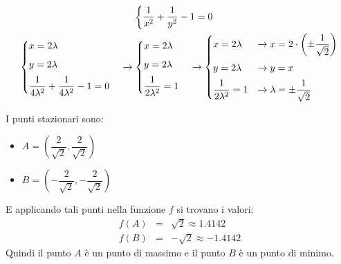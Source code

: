\documentclass[a4paper]{article}
\begin{document}
\begin{gather*}
\begin{cases}
			\dfrac{1}{x^{2}} + \dfrac{1}{y^{2}} - 1 = 0 \\
		\end{cases}
		\\
		\begin{cases}
			x = 2\lambda \vspace{.5em} \\
			y = 2\lambda \vspace{.5em} \\
			\dfrac{1}{4\lambda^{2}} + \dfrac{1}{4\lambda^{2}} - 1 = 0 \\
		\end{cases}
		\rightarrow
		\begin{cases}
			x = 2\lambda \vspace{.5em} \\
			y = 2\lambda \vspace{.5em} \\
			\dfrac{1}{2\lambda^{2}} = 1 \\
		\end{cases}
		\rightarrow
		\begin{cases}
			x = 2\lambda & \rightarrow x = 2\cdot\left(\pm \dfrac{1}{\sqrt{2}}\right) \vspace{.5em} \\
			y = 2\lambda & \rightarrow y = x \vspace{.5em} \\
			\dfrac{1}{2\lambda^{2}} = 1 & \rightarrow \lambda = \pm\dfrac{1}{\sqrt{2}} \\
		\end{cases}
	\end{gather*}\newpage

	\noindent
	I punti stazionari sono:
	\begin{multicols}{2}
		\begin{itemize}
			\item $A = \left(\dfrac{2}{\sqrt{2}}, \dfrac{2}{\sqrt{2}}\right)$

			\item $B = \left(-\dfrac{2}{\sqrt{2}}, -\dfrac{2}{\sqrt{2}}\right)$
		\end{itemize}
	\end{multicols}
	E applicando tali punti nella funzione $f$ si trovano i valori:
	\begin{equation*}
		\begin{array}{rcl}
			f\left(A\right) &=& \sqrt{2} \approx 1.4142 \\ [.3em]
			f\left(B\right) &=& -\sqrt{2} \approx -1.4142
		\end{array}
	\end{equation*}
	Quindi il punto $A$ è un punto di massimo e il punto $B$ è un punto di minimo.\newpage
\end{document}
